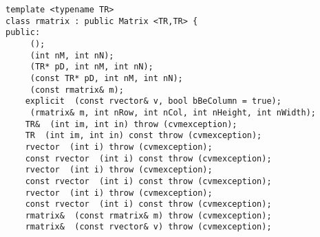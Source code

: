 \bigskip
\noindent
\verb"template <typename TR>"\\
\verb"class rmatrix : public Matrix <TR,TR> {"\\
\verb"public:"\\
\verb"    "\verb" ();"\\
\verb"    "\verb" (int nM, int nN);"\\
\verb"    "\verb" (TR* pD, int nM, int nN);"\\
\verb"    "\verb" (const TR* pD, int nM, int nN);"\\
\verb"    "\verb" (const rmatrix& m);"\\
\verb"    explicit "\verb" (const rvector& v, bool bBeColumn = true);"\\
\verb"    "\verb" (rmatrix& m, int nRow, int nCol, int nHeight, int nWidth);"\\
\verb"    TR& "\verb" (int im, int in) throw (cvmexception);"\\
\verb"    TR "\verb" (int im, int in) const throw (cvmexception);"\\
\verb"    rvector "\verb" (int i) throw (cvmexception);"\\
\verb"    const rvector "\verb" (int i) const throw (cvmexception);"\\
\verb"    rvector "\verb" (int i) throw (cvmexception);"\\
\verb"    const rvector "\verb" (int i) const throw (cvmexception);"\\
\verb"    rvector "\verb" (int i) throw (cvmexception);"\\
\verb"    const rvector "\verb" (int i) const throw (cvmexception);"\\
\verb"    rmatrix& "\verb" (const rmatrix& m) throw (cvmexception);"\\
\verb"    rmatrix& "\verb" (const rvector& v) throw (cvmexception);"\\
